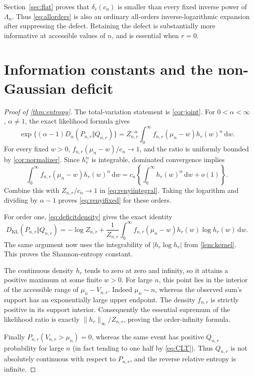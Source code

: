 \documentclass[11pt,oneside]{article}
\numberwithin{equation}{section}
\theoremstyle{plain}
\theoremstyle{definition}
\theoremstyle{remark}
\newcommand{\KL}{D_{\mathrm{KL}}}
\newcommand{\dd}{\,\mathrm d}
\begin{document}
Section~\ref{sec:flat} proves that $\delta_r(c_n)$ is smaller than every
fixed inverse power of $\Lambda_n$. Thus \eqref{eq:allorders} is also
an ordinary all-orders inverse-logarithmic expansion after suppressing
the defect. Retaining the defect is substantially more informative at
accessible values of $n$, and is essential when $r=0$.

\section{Information constants and the non-Gaussian deficit}
\label{sec:information}
\begin{proof}[Proof of \cref{thm:entropy}]
The total-variation statement is \cref{cor:joint}. For
$0<\alpha<\infty$, $\alpha\ne1$, the exact likelihood formula gives
\begin{equation}\label{eq:renyiintegral}
 \exp\{(\alpha-1)D_\alpha(P_{n,r}\Vert Q_{n,r})\}
 =Z_{n,r}^{-\alpha}\int_0^\infty
          f_{n,r}(\mu_n-w)h_r(w)^\alpha\dd w.
\end{equation}
For every fixed $w>0$, $f_{n,r}(\mu_n-w)/c_n\to1$, and the ratio
is uniformly bounded by \cref{cor:normalizer}. Since $h_r^\alpha$
is integrable, dominated convergence implies
\[
 \int_0^\infty f_{n,r}(\mu_n-w)h_r(w)^\alpha\dd w
   =c_n\left\{\int_0^\infty h_r(w)^\alpha\dd w+o(1)\right\}.
\]
Combine this with $Z_{n,r}/c_n\to1$ in \eqref{eq:renyiintegral}.
Taking the logarithm and dividing by $\alpha-1$ proves
\eqref{eq:renyifixed} for these orders.

For order one, \eqref{eq:deficitdensity} gives the exact identity
\begin{equation}\label{eq:KLexact}
 \KL(P_{n,r}\Vert Q_{n,r})
 =-\log Z_{n,r}
 +\frac1{Z_{n,r}}\int_0^\infty
       f_{n,r}(\mu_n-w)h_r(w)\log h_r(w)\dd w.
\end{equation}
The same argument now uses the integrability of $|h_r\log h_r|$
from \cref{lem:kernel}. This proves the Shannon-entropy constant.

The continuous density $h_r$ tends to zero at zero and infinity, so
it attains a positive maximum at some finite $w>0$. For large $n$,
this point lies in the interior of the accessible range of
$\mu_n-V_{n,r}$. Indeed $\mu_n\sim n$, whereas the observed sum's
support has an exponentially large upper endpoint. The density
$f_{n,r}$ is strictly positive in its support interior. Consequently
the essential supremum of the likelihood ratio is exactly
$\|h_r\|_\infty/Z_{n,r}$, proving the order-infinity formula.

Finally $P_{n,r}(V_{n,r}>\mu_n)=0$, whereas the same event has
positive $Q_{n,r}$ probability for large $n$ (in fact tending to
one half by \eqref{eq:CLT}). Thus $Q_{n,r}$ is not absolutely
continuous with respect to $P_{n,r}$, and the reverse relative
entropy is infinite.
\end{proof}
\end{document}
